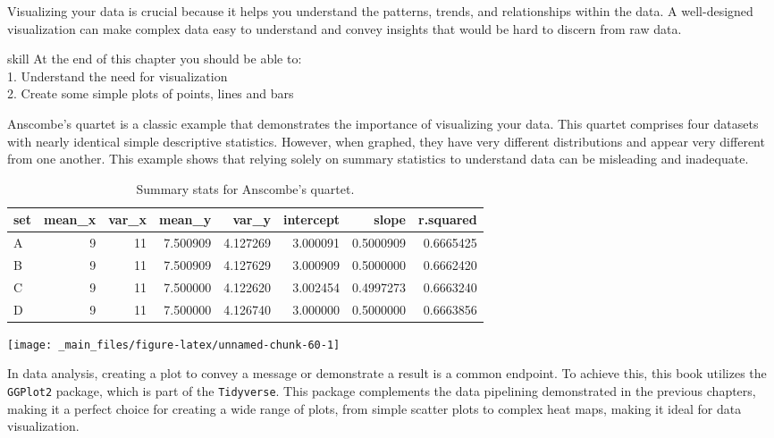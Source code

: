 \documentclass[
]{book}
\begin{document}
Visualizing your data is crucial because it helps you understand the patterns, trends, and relationships within the data. A well-designed visualization can make complex data easy to understand and convey insights that would be hard to discern from raw data.

\begin{infobox}{skill}
At the end of this chapter you should be able to:\\
1. Understand the need for visualization\\
2. Create some simple plots of points, lines and bars\\


\end{infobox}

Anscombe's quartet is a classic example that demonstrates the importance of visualizing your data. This quartet comprises four datasets with nearly identical simple descriptive statistics. However, when graphed, they have very different distributions and appear very different from one another. This example shows that relying solely on summary statistics to understand data can be misleading and inadequate.

\begin{table}

\caption{\label{tab:unnamed-chunk-59}Summary stats for Anscombe's quartet.}
\centering
\begin{tabular}[t]{l|r|r|r|r|r|r|r}
\hline
set & mean\_x & var\_x & mean\_y & var\_y & intercept & slope & r.squared\\
\hline
A & 9 & 11 & 7.500909 & 4.127269 & 3.000091 & 0.5000909 & 0.6665425\\
\hline
B & 9 & 11 & 7.500909 & 4.127629 & 3.000909 & 0.5000000 & 0.6662420\\
\hline
C & 9 & 11 & 7.500000 & 4.122620 & 3.002454 & 0.4997273 & 0.6663240\\
\hline
D & 9 & 11 & 7.500000 & 4.126740 & 3.000000 & 0.5000000 & 0.6663856\\
\hline
\end{tabular}
\end{table}

\begin{center}\texttt{[image: \_main\_files/figure-latex/unnamed-chunk-60-1]} \end{center}

In data analysis, creating a plot to convey a message or demonstrate a result is a common endpoint. To achieve this, this book utilizes the \texttt{GGPlot2} package, which is part of the \texttt{Tidyverse}. This package complements the data pipelining demonstrated in the previous chapters, making it a perfect choice for creating a wide range of plots, from simple scatter plots to complex heat maps, making it ideal for data visualization.
\end{document}
